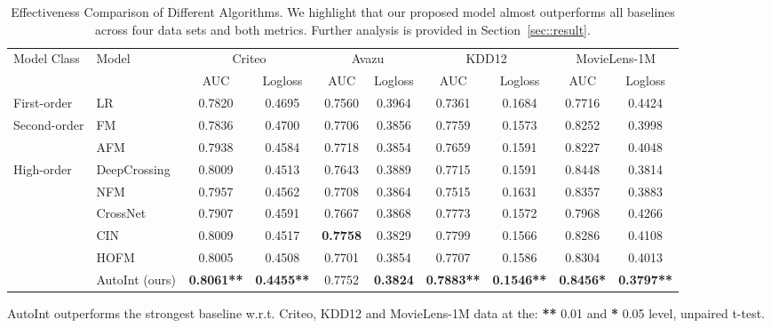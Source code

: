 \begin{table*}
\begin{threeparttable}
\centering\caption{Effectiveness Comparison of Different Algorithms. We highlight that our proposed model almost outperforms all baselines across four data sets and both metrics. Further analysis is provided in Section~\ref{sec::result}.}\label{tab::results}
\tabcolsep=0.24cm
\begin{tabular}{llcccccccc}
\toprule
\multirow{2}{*}{Model Class} & \multirow{2}{*}{Model} & \multicolumn{2}{c}{Criteo} & \multicolumn{2}{c}{Avazu} & \multicolumn{2}{c}{KDD12} & \multicolumn{2}{c}{MovieLens-1M} \\
& & AUC & Logloss & AUC & Logloss & AUC & Logloss & AUC & Logloss \\
\midrule
\multirow{1}{*}{First-order} & LR & 0.7820 & 0.4695 & 0.7560 & 0.3964 & 0.7361 & 0.1684 & 0.7716 & 0.4424 \\
\midrule
\multirow{2}{*}{Second-order} & FM~\cite{rendle2010factorization} & 0.7836 & 0.4700 & 0.7706 & 0.3856 & 0.7759 & 0.1573 & 0.8252 & 0.3998 \\ 
& AFM\cite{xiao2017attentional} & 0.7938 & 0.4584 & 0.7718 & 0.3854 & 0.7659 & 0.1591 & 0.8227 & 0.4048 \\
\midrule
\multirow{6}{*}{High-order} & DeepCrossing~\cite{shan2016deep} & 0.8009 &0.4513 & 0.7643 & 0.3889 & 0.7715 & 0.1591 & 0.8448 & 0.3814 \\
& NFM~\cite{he2017neural} & 0.7957 & 0.4562 & 0.7708 & 0.3864 & 0.7515 & 0.1631 & 0.8357 & 0.3883 \\
& CrossNet~\cite{wang2017deep} & 0.7907 & 0.4591 & 0.7667 & 0.3868 & 0.7773 & 0.1572 & 0.7968 & 0.4266 \\
& CIN~\cite{lian2018xdeepfm} & 0.8009 & 0.4517 & \textbf{0.7758} & 0.3829 & 0.7799 & 0.1566 & 0.8286 & 0.4108 \\
& HOFM~\cite{blondel2016higher} & 0.8005 & 0.4508 & 0.7701 & 0.3854 & 0.7707 & 0.1586 & 0.8304 & 0.4013 \\
& AutoInt (ours)  & \textbf{0.8061**} & \textbf{0.4455**} & 0.7752 & \textbf{0.3824} & \textbf{0.7883**} & \textbf{0.1546**} & \textbf{0.8456*} & \textbf{0.3797**}  \\
\bottomrule
\end{tabular}
    \begin{tablenotes}
    \centering
      \small
      \item AutoInt outperforms the strongest baseline w.r.t. Criteo, KDD12 and MovieLens-1M data at the: \textbf{**} 0.01 and \textbf{*} 0.05 level, unpaired t-test.
    \end{tablenotes}
\end{threeparttable}
\end{table*}



